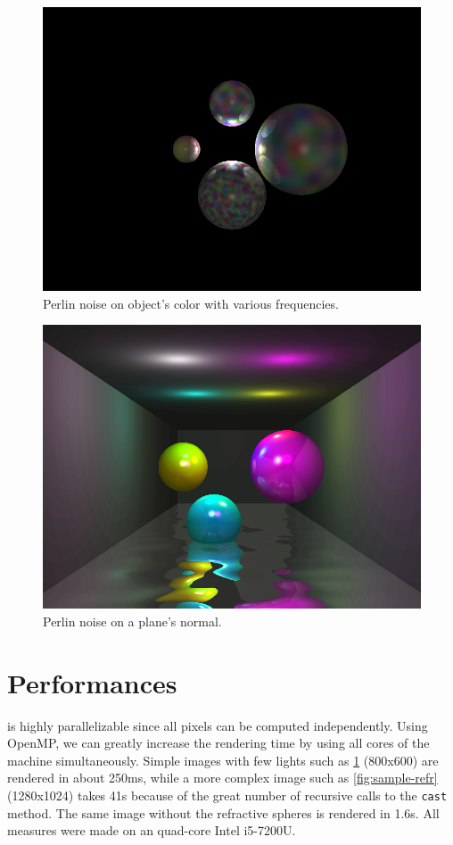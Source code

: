 \documentclass[a4paper,12pt,journal,twoside,compsoc]{PPIEEEtran}
\begin{document}
\begin{figure}
  \begin{center}
    \includegraphics[width=0.7\linewidth]{perlin-color.png}
  \end{center}
  \caption{Perlin noise on object's color with various frequencies.}
  \label{fig:perlin-color}
\end{figure}

\begin{figure}
  \begin{center}
    \includegraphics[width=0.7\linewidth]{perlin-normal.png}
  \end{center}
  \caption{Perlin noise on a plane's normal.}
  \label{fig:perlin-normal}
\end{figure}

\section{Performances}
is highly parallelizable since all pixels can be computed
independently.  Using OpenMP, we can greatly increase the rendering time by
using all cores of the machine simultaneously.  Simple images with few lights
such as \cref{fig:perlin-color} (800x600) are rendered in about 250ms, while a
more complex image such as \cref{fig:sample-refr} (1280x1024) takes 41s because
of the great number of recursive calls to the \texttt{cast} method.  The same
image without the refractive spheres is rendered in 1.6s.  All measures were
made on an quad-core Intel i5-7200U.
\end{document}
